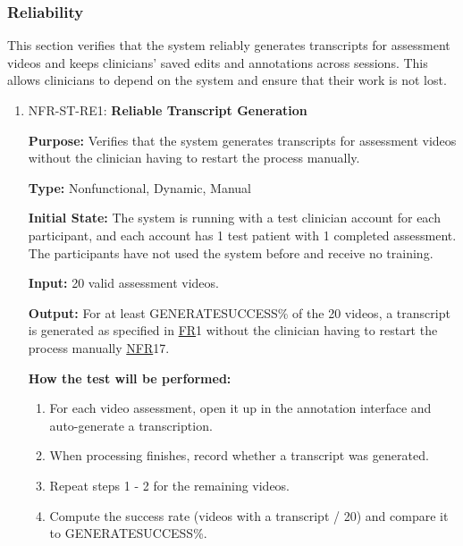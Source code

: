 \documentclass[12pt, titlepage]{article}
\newcommand{\srsfr}[1]{\href{https://github.com/Nour-Fawaz/MacaBoca/blob/main/pdfs/SRS/SRS.pdf}{FR}}
\newcommand{\srsnfr}[1]{\href{https://github.com/Nour-Fawaz/MacaBoca/blob/main/pdfs/SRS/SRS.pdf}{NFR}}
\renewcommand{\_}{\oldunderscore\allowbreak}
\begin{document}
\subsubsection{Reliability}
This section verifies that the system reliably generates transcripts for assessment videos and keeps clinicians' saved edits and annotations across sessions. 
This allows clinicians to depend on the system and ensure that their work is not lost.
\begin{enumerate}
  \item NFR-ST-RE1: \textbf{Reliable Transcript Generation\\}
  \begin{mdframed}[linewidth=0.5mm]
      \textbf{Purpose:} Verifies that the system generates transcripts for assessment videos without the clinician having to restart the process manually. \par
      \textbf{Type:} Nonfunctional, Dynamic, Manual \par
      \textbf{Initial State:} The system is running with a test clinician account for each participant, and each account has 1 test patient with 1 completed assessment. The participants have not used the system before and receive no training. \par
      \textbf{Input:} 20 valid assessment videos. \par
      \textbf{Output:} For at least GENERATE\_SUCCESS\% of the 20 videos, a transcript is generated as specified in \srsfr*{1} without the clinician having to restart the process manually \srsnfr*{17}. \par
      \textbf{How the test will be performed:}
      \begin{enumerate}
      \item[1.] For each video assessment, open it up in the annotation interface and auto-generate a transcription.
      \item[2.] When processing finishes, record whether a transcript was generated.
      \item[3.] Repeat steps 1 - 2 for the remaining videos.
      \item[4.] Compute the success rate (videos with a transcript / 20) and compare it to GENERATE\_SUCCESS\%.
      \end{enumerate}
  \end{mdframed}


\end{enumerate}
\end{document}

